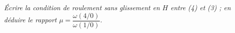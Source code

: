 \documentclass[10pt,fleqn]{article} %
\begin{document}
\begin{multicols}{2}
\subparagraph{}
\textit{Écrire la condition de roulement sans glissement en $H$ entre (4) et (3) ; en déduire le rapport $\mu=\dfrac{\omega(4/0)}{\omega(1/0)}$.}


%
%
%
%
%
%
%

\end{multicols}
\end{document}
